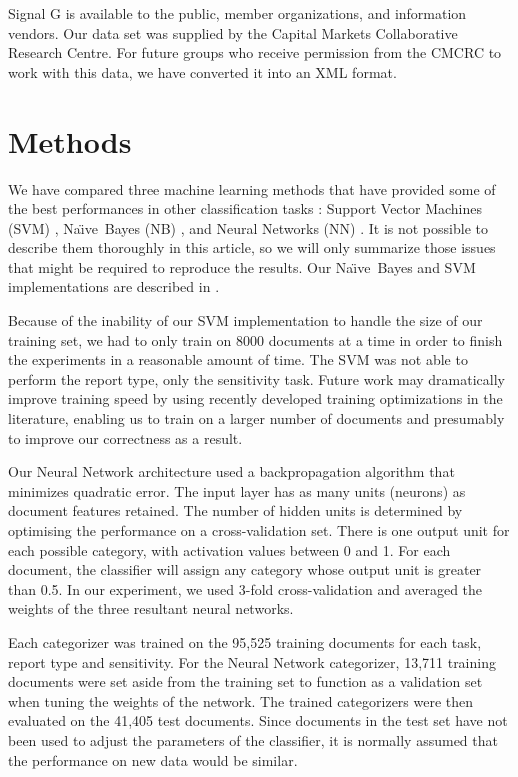 \documentclass[twocolumn]{article}
\newcommand{\naive}{Na\"\i ve}
\begin{document}
Signal G is available to the public, member organizations, and
information vendors.  Our data set was supplied by the Capital Markets
Collaborative Research Centre.  For future groups who receive
permission from the CMCRC to work with this data, we have converted it
into an XML format.



\section{Methods}
\label{methods}


We have compared three machine learning methods that have provided
some of the best performances in other classification tasks
\cite{yang:99}: Support Vector Machines (SVM) \cite{scholkopf:99}
\cite{joachims:99}, \naive\ Bayes (NB) \cite{lewis:98}, and Neural
Networks (NN) \cite{calvo:00} \cite{calvo:01}. It is not possible to
describe them thoroughly in this article, so we will only summarize
those issues that might be required to reproduce the results.  Our
\naive\ Bayes and SVM implementations are described in
\cite{williams:02}.

Because of the inability of our SVM implementation to handle the size
of our training set, we had to only train on 8000 documents at a time
in order to finish the experiments in a reasonable amount of time.
The SVM was not able to perform the report type, only the sensitivity
task.  Future work may dramatically improve training speed by using
recently developed training optimizations in the literature, enabling
us to train on a larger number of documents and presumably to improve
our correctness as a result.

Our Neural Network architecture \cite{calvo:00} \cite{calvo:01} used a
backpropagation algorithm that minimizes quadratic error. The input
layer has as many units (neurons) as document features retained. The
number of hidden units is determined by optimising the performance on
a cross-validation set. There is one output unit for each possible
category, with activation values between 0 and 1. For each document,
the classifier will assign any category whose output unit is greater
than 0.5. In our experiment, we used 3-fold cross-validation and
averaged the weights of the three resultant neural networks.

Each categorizer was trained on the 95,525 training documents for each
task, report type and sensitivity.  For the Neural Network
categorizer, 13,711 training documents were set aside from the
training set to function as a validation set when tuning the weights
of the network.  The trained categorizers were then evaluated on the
41,405 test documents. Since documents in the test set have not been
used to adjust the parameters of the classifier, it is normally
assumed that the performance on new data would be similar.
\end{document}
